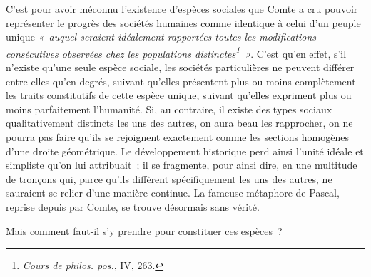 \documentclass[french,twoside]{book} %
\begin{document}
C’est pour avoir méconnu l’existence d’espèces sociales que Comte a cru pouvoir représenter le progrès des sociétés humaines comme identique à celui d’un peuple unique \emph{« auquel seraient idéalement rapportées toutes les modifications consécutives observées chez les populations distinctes\footnote{\emph{Cours de philos. pos.}, IV, 263.} »}. C’est qu’en effet, s’il n’existe qu’une seule espèce sociale, les sociétés particulières ne peuvent différer entre elles qu’en degrés, suivant qu’elles présentent plus ou moins complètement les traits constitutifs de cette espèce unique, suivant qu’elles expriment plus ou moins parfaitement l’humanité. Si, au contraire, il existe des types sociaux qualitativement distincts les uns des autres, on aura beau les rapprocher, on ne pourra pas faire qu’ils se rejoignent exactement comme les sections homogènes d’une droite géométrique. Le développement historique perd ainsi l’unité idéale et simpliste qu’on lui attribuait ; il se fragmente, pour ainsi dire, en une multitude de tronçons qui, parce qu’ils diffèrent spécifiquement les uns des autres, ne sauraient se relier d’une manière continue. La fameuse métaphore de Pascal, reprise depuis par Comte, se trouve désormais sans vérité.\par
Mais comment faut-il s’y prendre pour constituer ces espèces ?\par
\end{document}
